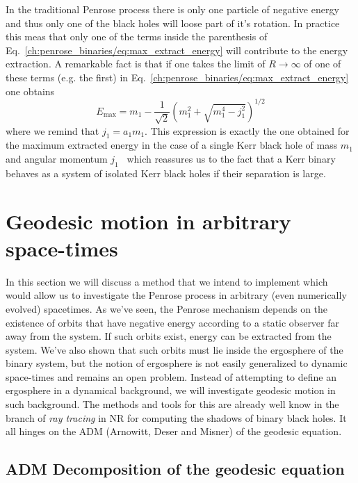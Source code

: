 In the traditional Penrose process there is only one particle of negative energy and thus only one of the black holes will loose part of it's rotation. In practice this meas that only one of the terms inside the parenthesis of Eq.~\ref{ch:penrose_binaries/eq:max_extract_energy} will contribute to the energy extraction. A remarkable fact is that if one takes the limit of $R \rightarrow \infty$ of one of these terms (e.g. the first) in Eq.~\ref{ch:penrose_binaries/eq:max_extract_energy} one obtains
%
\begin{equation}
  E_{\text{max}} = m_1 - \frac{1}{\sqrt{2}}\left(m_1^2 + \sqrt{m_1^4 - j_1^2}\right)^{1/2}
  \label{ch:penrose_binaries/eq:energy_extraction_kerr_limit}
\end{equation}
%
where we remind that $j_1=a_1m_1$. This expression is exactly the one obtained for the maximum extracted energy in the case of a single Kerr black hole of mass $m_1$ and angular momentum $j_1$~\cite{CARROLL} which reassures us to the fact that a Kerr binary behaves as a system of isolated Kerr black holes if their separation is large.

\section{Geodesic motion in arbitrary space-times}

In this section we will discuss a method that we intend to implement which would allow us to investigate the Penrose process in arbitrary (even numerically evolved) spacetimes. As we've seen, the Penrose mechanism depends on the existence of orbits that have negative energy according to a static observer far away from the system. If such orbits exist, energy can be extracted from the system. We've also shown that such orbits must lie inside the ergosphere of the binary system, but the notion of ergosphere is not easily generalized to dynamic space-times and remains an open problem. Instead of attempting to define an ergosphere in a dynamical background, we will investigate geodesic motion in such background. The methods and tools for this are already well know in the branch of \emph{ray tracing} in NR for computing the shadows of binary black holes. It all hinges on the ADM (Arnowitt, Deser and Misner) of the geodesic equation.

\subsection{ADM Decomposition of the geodesic equation}

